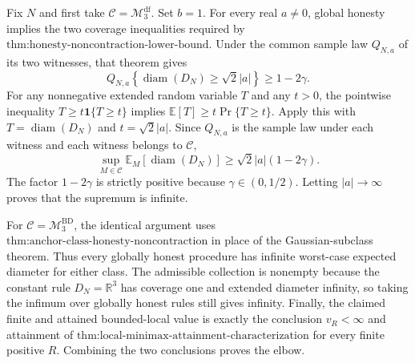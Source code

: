 Fix \(N\) and first take \(\mathcal C=\mathcal M_3^{\mathrm{df}}\).  Set \(b=1\).  For every real \(a\neq0\), global honesty implies the two coverage inequalities required by \(\text{thm:honesty-noncontraction-lower-bound}\).  Under the common sample law \(Q_{N,a}\) of its two witnesses, that theorem gives
\[
 Q_{N,a}\!\left\{\operatorname{diam}(D_N)\ge\sqrt2|a|\right\}\ge1-2\gamma.
\]
For any nonnegative extended random variable \(T\) and any \(t>0\), the pointwise inequality \(T\ge t\mathbf1\{T\ge t\}\) implies \(\mathbb E[T]\ge t\Pr\{T\ge t\}\).  Apply this with \(T=\operatorname{diam}(D_N)\) and \(t=\sqrt2|a|\).  Since \(Q_{N,a}\) is the sample law under each witness and each witness belongs to \(\mathcal C\),
\[
 \sup_{M\in\mathcal C}\mathbb E_M\!\left[\operatorname{diam}(D_N)\right]
 \ge \sqrt2|a|(1-2\gamma).
\]
The factor \(1-2\gamma\) is strictly positive because \(\gamma\in(0,1/2)\).  Letting \(|a|\to\infty\) proves that the supremum is infinite.

For \(\mathcal C=\mathcal M_3^{\mathrm{BD}}\), the identical argument uses \(\text{thm:anchor-class-honesty-noncontraction}\) in place of the Gaussian-subclass theorem.  Thus every globally honest procedure has infinite worst-case expected diameter for either class.  The admissible collection is nonempty because the constant rule \(D_N=\mathbb R^3\) has coverage one and extended diameter infinity, so taking the infimum over globally honest rules still gives infinity.  Finally, the claimed finite and attained bounded-local value is exactly the conclusion \(v_R<\infty\) and attainment of \(\text{thm:local-minimax-attainment-characterization}\) for every finite positive \(R\).  Combining the two conclusions proves the elbow.